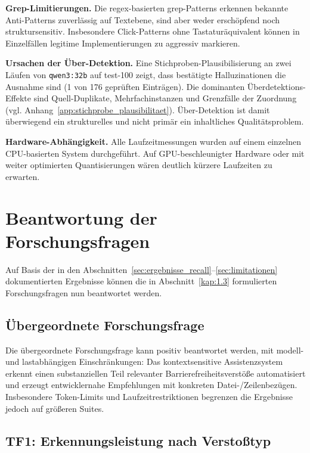 \textbf{Grep-Limitierungen.}
Die regex-basierten grep-Patterns erkennen bekannte Anti-Patterns zuverlässig auf Textebene, sind aber weder erschöpfend noch struktursensitiv. Insbesondere Click-Patterns ohne Tastaturäquivalent können in Einzelfällen legitime Implementierungen zu aggressiv markieren.

\textbf{Ursachen der Über-Detektion.}
Eine Stichproben-Plausibilisierung an zwei Läufen von \texttt{qwen3:32b} auf test-100 zeigt, dass bestätigte Halluzinationen die Ausnahme sind (1 von 176 geprüften Einträgen). Die dominanten Überdetektions-Effekte sind Quell-Duplikate, Mehrfachinstanzen und Grenzfälle der Zuordnung (vgl. Anhang~\ref{app:stichprobe_plausibilitaet}). Über-Detektion ist damit überwiegend ein strukturelles und nicht primär ein inhaltliches Qualitätsproblem.

\textbf{Hardware-Abhängigkeit.}
Alle Laufzeitmessungen wurden auf einem einzelnen \ac{CPU}-basierten System durchgeführt. Auf \ac{GPU}-beschleunigter Hardware oder mit weiter optimierten Quantisierungen wären deutlich kürzere Laufzeiten zu erwarten.

\section{Beantwortung der Forschungsfragen}
\label{sec:ff_beantwortung}

Auf Basis der in den Abschnitten~\ref{sec:ergebnisse_recall}--\ref{sec:limitationen} dokumentierten Ergebnisse können die in Abschnitt~\ref{kap:1.3} formulierten Forschungsfragen nun beantwortet werden.

\subsection{Übergeordnete Forschungsfrage}
\label{sec:ff_gesamt}

Die übergeordnete Forschungsfrage kann positiv beantwortet werden, mit modell- und lastabhängigen Einschränkungen: Das kontextsensitive Assistenzsystem erkennt einen substanziellen Teil relevanter Barrierefreiheitsverstöße automatisiert und erzeugt entwicklernahe Empfehlungen mit konkreten Datei-/Zeilenbezügen. Insbesondere Token-Limits und Laufzeitrestriktionen begrenzen die Ergebnisse jedoch auf größeren Suites.

\subsection{TF1: Erkennungsleistung nach Verstoßtyp}
\label{sec:ff_tf1}

